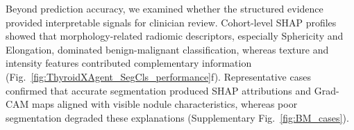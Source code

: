\documentclass[fleqn,10pt]{wlscirep}
\begin{document}

Beyond prediction accuracy, we examined whether the structured evidence provided interpretable signals for clinician review. Cohort-level SHAP profiles~\cite{lundberg2017unified} showed that morphology-related radiomic descriptors, especially Sphericity and Elongation, dominated benign-malignant classification, whereas texture and intensity features contributed complementary information (Fig.~\ref{fig:ThyroidXAgent_SegCls_performance}f). Representative cases confirmed that accurate segmentation produced SHAP attributions and Grad-CAM maps aligned with visible nodule characteristics, whereas poor segmentation degraded these explanations (Supplementary Fig.~\ref{fig:BM_cases}).
\end{document}
